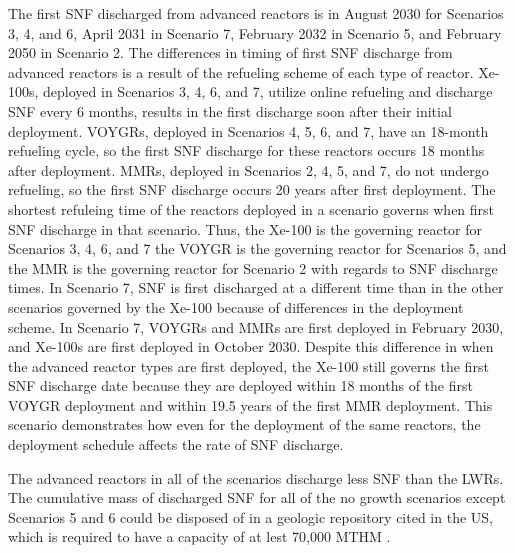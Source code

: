 The first \gls{SNF} discharged from advanced reactors is in August 
2030 for Scenarios 3, 4, and 6, April 2031 in Scenario 7, February 2032 
in Scenario 5, and 
February 2050 in Scenario 2. The differences in timing of first \gls{SNF} 
discharge from advanced reactors is a result of the refueling scheme of 
each type of reactor. Xe-100s, deployed in Scenarios 3, 4, 6, 
and 7, utilize online refueling and discharge \gls{SNF} 
every 6 months, results in the first discharge soon after their initial 
deployment. VOYGRs, deployed in Scenarios 4, 5, 6, and 7, have an 
18-month refueling cycle, so the first \gls{SNF} discharge for these 
reactors occurs 18 months after deployment. \glspl{MMR}, deployed in 
Scenarios 2, 4, 5, and 7, do not undergo refueling, so the first \gls{SNF} 
discharge occurs 20 years after first deployment. The shortest refuleing 
time of the reactors deployed in a scenario governs when 
first \gls{SNF} discharge in that scenario. Thus, the Xe-100 is the 
governing reactor for 
Scenarios 3, 4, 6, and 7 the VOYGR is the governing reactor for Scenarios  
5, and the \gls{MMR} is the governing reactor for Scenario 2 with regards 
to \gls{SNF} discharge times. In Scenario 7, \gls{SNF} is first discharged 
at a different time than in the other scenarios governed by the Xe-100
because of differences in the deployment scheme. In Scenario 7, VOYGRs and
\glspl{MMR} are first deployed in February 2030, and Xe-100s are first 
deployed in October 2030. Despite this difference in when the advanced 
reactor types are first deployed, the Xe-100 still governs the first \gls{SNF}
discharge date because they are deployed within 18 months of the first 
VOYGR deployment and within 19.5 years of the first \gls{MMR} 
deployment. This scenario demonstrates how even for the deployment of 
the same reactors, the deployment schedule affects the rate of \gls{SNF} 
discharge. 

The 
advanced reactors in all of the scenarios discharge 
less \gls{SNF} than the \glspl{LWR}. The cumulative mass of discharged 
\gls{SNF} for all of the no growth scenarios except Scenarios 5 and 6 
could be 
disposed of in a geologic repository cited in the US, which is required 
to have a capacity of at lest 70,000 MTHM \cite{noauthor_nuclear_1983}.


